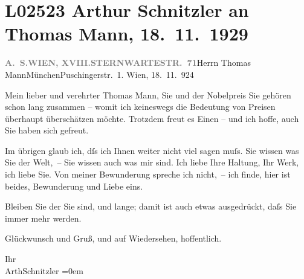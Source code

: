 

\section[Arthur Schnitzler an Thomas Mann, 18. 11. 1929]{L02523 Arthur Schnitzler an Thomas Mann, 18. 11. 1929}
\nopagebreak{}
\rehead{ }\normalsize\beginnumbering{}
\toendnotes[C]{\smallbreak\pagebreak[2]}
\pstart{}{\pb}\textcolor{gray}{\textbf{A. S.}}\pend{}\pstart{}\textcolor{gray}{\textbf{WIEN, XVIII.}}\pend{}\pstart{}\textcolor{gray}{\textbf{STERNWARTESTR. 71}}\pend{}{\bigskip}\pstart{}{\pb}Herrn Thomas Mann\pend{}\pstart{}München\pend{}\pstart{}Puschingerstr. 1.\pend{}{\bigskip}\vspace{1em}
\pstart
           \raggedleft{}{\pb}Wien, 18. 11. 924\pend
           
\pstart{}Mein lieber und verehrter Thomas Mann,\pend\vspace{0.5em}
\pstart
           Sie und der Nobelpreis Sie gehören schon lang
               zusammen – womit ich keineswegs die Bedeutung von Preisen überhaupt überschätzen
               möchte. Trotzdem freut es Einen – und ich hoffe, auch Sie haben sich gefreut.\pend
           
\pstart
           Im übrigen glaub ich, dſs ich Ihnen weiter nicht viel sagen muſs. Sie wissen was Sie
               der Welt, – Sie wissen auch was {\pb}mir sind. Ich liebe Ihre Haltung, Ihr Werk, ich liebe Sie. Von meiner Bewunderung
               spreche ich nicht, – ich finde, hier ist beides, Bewunderung und Liebe eins.\pend
           
\pstart
           Bleiben Sie der Sie sind, und lange; damit ist auch etwas ausgedrückt, daſs Sie immer
               mehr werden.\pend
           
\pstart
           Glückwunsch und Gruß, und auf Wiedersehen, hoffentlich.\pend
           
\pstart
           Ihr{\\[\baselineskip]}\spacefill\mbox{ArthSchnitzler}\pend
           \leftskip=0em{}\endnumbering{}  
      